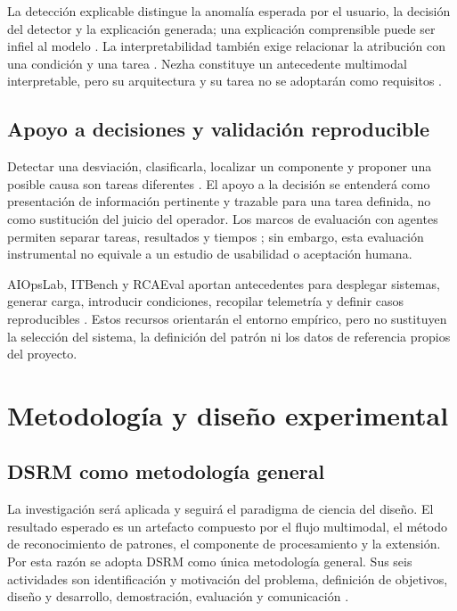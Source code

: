 \documentclass[conference]{IEEEtran}
\begin{document}
La detección explicable distingue la anomalía esperada por el usuario, la decisión del detector y la explicación generada; una explicación comprensible puede ser infiel al modelo \cite{ref12}. La interpretabilidad también exige relacionar la atribución con una condición y una tarea \cite{ref13}. Nezha constituye un antecedente multimodal interpretable, pero su arquitectura y su tarea no se adoptarán como requisitos \cite{ref8}.

\subsection{Apoyo a decisiones y validación reproducible}

Detectar una desviación, clasificarla, localizar un componente y proponer una posible causa son tareas diferentes \cite{ref10}. El apoyo a la decisión se entenderá como presentación de información pertinente y trazable para una tarea definida, no como sustitución del juicio del operador. Los marcos de evaluación con agentes permiten separar tareas, resultados y tiempos \cite{ref14}; sin embargo, esta evaluación instrumental no equivale a un estudio de usabilidad o aceptación humana.

AIOpsLab, ITBench y RCAEval aportan antecedentes para desplegar sistemas, generar carga, introducir condiciones, recopilar telemetría y definir casos reproducibles \cite{ref9,ref14,ref21}. Estos recursos orientarán el entorno empírico, pero no sustituyen la selección del sistema, la definición del patrón ni los datos de referencia propios del proyecto.

\section{Metodología y diseño experimental}

\subsection{DSRM como metodología general}

La investigación será aplicada y seguirá el paradigma de ciencia del diseño. El resultado esperado es un artefacto compuesto por el flujo multimodal, el método de reconocimiento de patrones, el componente de procesamiento y la extensión. Por esta razón se adopta DSRM como única metodología general. Sus seis actividades son identificación y motivación del problema, definición de objetivos, diseño y desarrollo, demostración, evaluación y comunicación \cite{ref23}.
\end{document}

